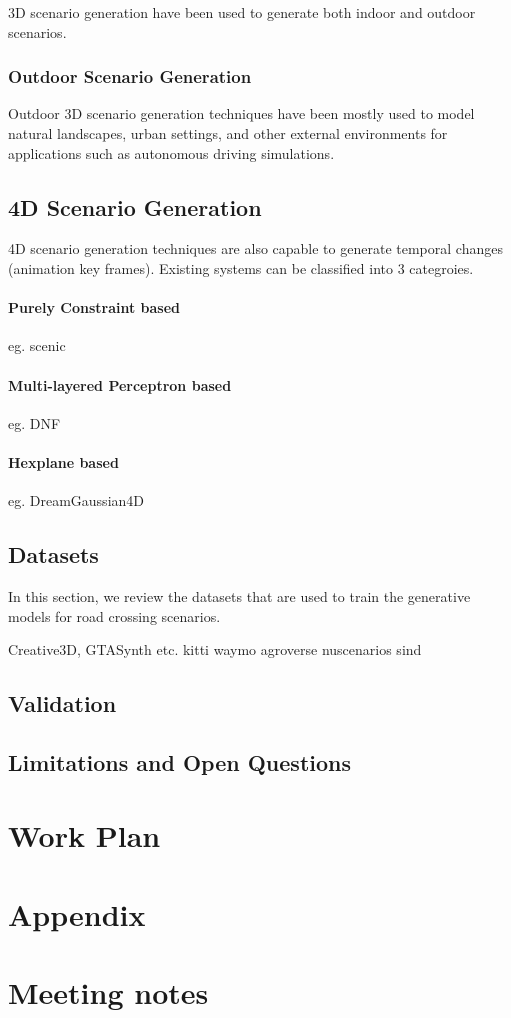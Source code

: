 \documentclass{article}
\begin{document}
3D scenario generation have been used to generate both indoor and outdoor scenarios.


\subsubsection{Outdoor Scenario Generation}

Outdoor 3D scenario generation techniques have been mostly used to model natural landscapes, urban settings, and other external environments for applications such as autonomous driving simulations.

\subsection{4D Scenario Generation}

4D scenario generation techniques are also capable to generate temporal changes (animation key frames). Existing systems can be classified into 3 categroies.

\paragraph{Purely Constraint based} eg. scenic

\paragraph{Multi-layered Perceptron based} eg. DNF

\paragraph{Hexplane based} eg. DreamGaussian4D

\subsection{Datasets}

In this section, we review the datasets that are used to train the generative models for road crossing scenarios. 



Creative3D, GTASynth etc.
kitti
waymo
agroverse
nuscenarios
sind

\subsection{Validation}

\subsection{Limitations and Open Questions}


\section{Work Plan}





\section*{Appendix}

\section{Meeting notes}
\end{document}
